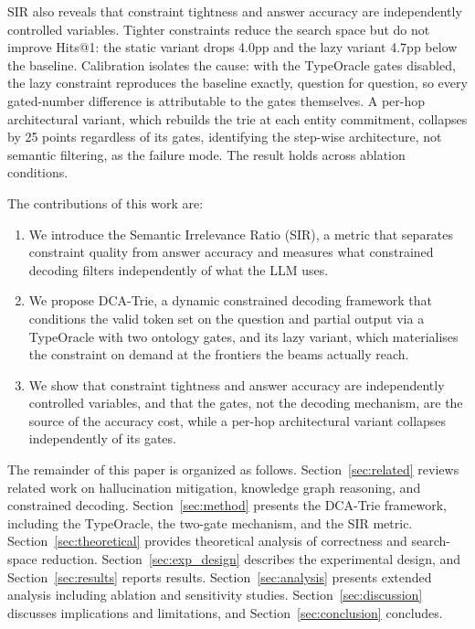 SIR also reveals that constraint tightness and answer accuracy are independently
controlled variables. Tighter constraints reduce the search space but do not improve
Hits@1: the static variant drops 4.0pp and the lazy variant 4.7pp below the baseline.
Calibration isolates the cause: with the TypeOracle gates disabled, the lazy constraint
reproduces the baseline exactly, question for question, so every gated-number
difference is attributable to the gates themselves. A per-hop architectural variant,
which rebuilds the trie at each entity commitment, collapses by 25 points regardless of
its gates, identifying the step-wise architecture, not semantic filtering, as the
failure mode. The result holds across ablation conditions.

\label{sec:intro:results}
The contributions of this work are:
\begin{enumerate}[label=(\arabic*)]
      \item We introduce the Semantic Irrelevance Ratio (SIR), a metric that separates
            constraint quality from answer accuracy and measures what
            constrained decoding filters independently of what the LLM uses.
      \item We propose DCA-Trie, a dynamic constrained decoding framework that conditions
            the valid token set on the question and partial output via a TypeOracle with two
            ontology gates, and its lazy variant, which materialises the constraint on demand
            at the frontiers the beams actually reach.
      \item We show that constraint tightness and answer accuracy are independently
            controlled variables, and that the gates, not the decoding
            mechanism, are the source of the accuracy cost, while a per-hop architectural
            variant collapses independently of its gates.
\end{enumerate}

The remainder of this paper is organized as follows. Section~\ref{sec:related} reviews
related work on hallucination mitigation, knowledge graph reasoning, and constrained
decoding. Section~\ref{sec:method} presents the DCA-Trie framework, including the
TypeOracle, the two-gate mechanism, and the SIR metric.
Section~\ref{sec:theoretical} provides theoretical analysis of correctness and
search-space reduction. Section~\ref{sec:exp_design} describes the experimental
design, and Section~\ref{sec:results} reports results. Section~\ref{sec:analysis}
presents extended analysis including ablation and sensitivity studies.
Section~\ref{sec:discussion} discusses implications and limitations, and
Section~\ref{sec:conclusion} concludes.
